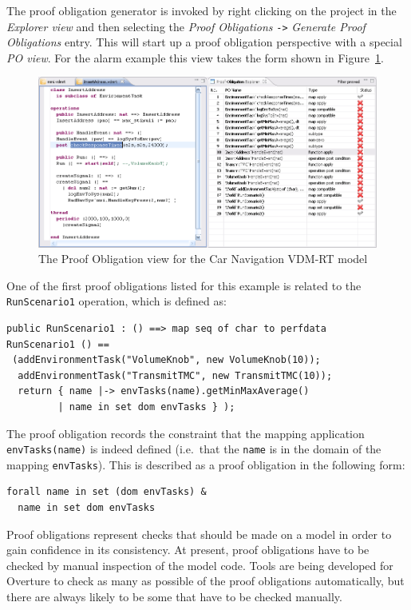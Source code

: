 The proof obligation generator is invoked by right clicking on the
project in the \emph{Explorer view} and then selecting the \emph{Proof
  Obligations} \texttt{->} \emph{Generate Proof Obligations}
entry. This will start up a proof obligation perspective with a
special \emph{PO view}. For the alarm example this view takes the form
shown in Figure~\ref{fig:POview}.

\begin{figure}[htbp]
\begin{center}
\includegraphics[width=4.5in]{figures/POviewRT}
\caption{The Proof Obligation view for the Car Navigation VDM-RT model\label{fig:POview}}
\end{center}
\end{figure}

One of the first proof obligations listed for this example is related
to the \texttt{RunScenario1} operation, which is defined as:

\begin{lstlisting}
public RunScenario1 : () ==> map seq of char to perfdata
RunScenario1 () ==
 (addEnvironmentTask("VolumeKnob", new VolumeKnob(10));
  addEnvironmentTask("TransmitTMC", new TransmitTMC(10));
  return { name |-> envTasks(name).getMinMaxAverage() 
         | name in set dom envTasks } );
\end{lstlisting}

The proof obligation records the constraint that the mapping
application \texttt{envTasks(name)} is indeed defined (i.e.\ that the
\texttt{name} is in the domain of the mapping \texttt{envTasks}). This is described as a proof
obligation in the following form:

\begin{lstlisting}
forall name in set (dom envTasks) &
  name in set dom envTasks
\end{lstlisting}
Proof obligations represent checks that should be made on a model in
order to gain confidence in its consistency. At present, proof
obligations have to be checked by manual inspection of the model
code. Tools are being developed for Overture to check as many as
possible of the proof obligations automatically, but there are always
likely to be some that have to be checked manually. 


